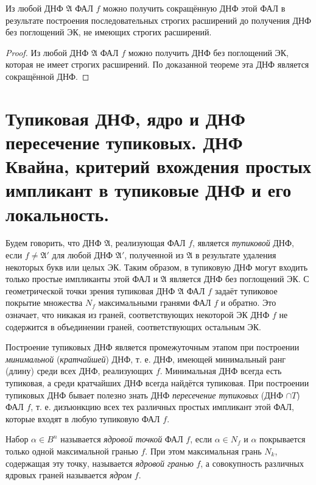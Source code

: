 \documentclass[11pt]{article}
\def\zall{\setcounter{lem}{0}\setcounter{cnsqnc}{0}\setcounter{th}{0}\setcounter{Cmt}{0}\setcounter{equation}{0}\setcounter{stnmt}{0}}
\newcounter{lem}\setcounter{lem}{0}
\newcounter{th}\setcounter{th}{0}
\newcounter{cnsqnc}\setcounter{cnsqnc}{0}
\def\cnsqnc{\par\smallskip\refstepcounter{cnsqnc}\textbf{\arabic{cnsqnc}}}
\newtheorem*{Consequence}{Следствие \cnsqnc}
\newcounter{Cmt}\setcounter{Cmt}{0}
\newcounter{stnmt}\setcounter{stnmt}{0}
\begin{document}
\begin{Consequence}
Из любой ДНФ $\mathfrak{A}$ ФАЛ $f$ можно получить сокращённую ДНФ этой ФАЛ в результате построения последовательных строгих расширений до получения ДНФ без поглощений ЭК, не имеющих строгих расширений.
\end{Consequence}
\begin{proof}
Из любой ДНФ $\mathfrak{A}$ ФАЛ $f$ можно получить ДНФ без поглощений ЭК, которая не имеет строгих расширений. По доказанной теореме эта ДНФ является сокращённой ДНФ.
\end{proof}
\pagebreak
\zall
\section{Тупиковая ДНФ, ядро и ДНФ пересечение тупиковых. ДНФ Квайна, критерий вхождения простых импликант в тупиковые ДНФ и его локальность.}
\label{sec:org9be750a}
Будем говорить, что ДНФ \(\mathfrak{A}\), реализующая ФАЛ \(f\), является \emph{тупиковой} ДНФ, если \(f \neq \mathfrak{A'}\) для любой ДНФ \(\mathfrak{A'}\), полученной из \(\mathfrak{A}\) в результате удаления некоторых букв или целых ЭК. Таким образом, в тупиковую ДНФ могут входить только простые импликанты этой ФАЛ и \(\mathfrak{A}\) является ДНФ без поглощений ЭК. С геометрической точки зрения тупиковая ДНФ \(\mathfrak{A}\) ФАЛ \(f\) задаёт тупиковое покрытие множества \(N_f\) максимальными гранями ФАЛ \(f\) и обратно. Это означает, что никакая из граней, соответствующих некоторой ЭК ДНФ \(f\) не содержится в объединении граней, соответствующих остальным ЭК.

Построение тупиковых ДНФ является промежуточным этапом при построении \emph{минимальной} (\emph{кратчайшей}) ДНФ, т. е. ДНФ, имеющей минимальный ранг (длину) среди всех ДНФ, реализующих \(f\). Минимальная ДНФ всегда есть тупиковая, а среди кратчайших ДНФ всегда найдётся тупиковая.
При построении тупиковых ДНФ бывает полезно знать ДНФ \emph{пересечение тупиковых} (ДНФ \(\cap T\)) ФАЛ \(f\), т. е. дизъюнкцию всех тех различных простых импликант этой ФАЛ, которые входят в любую тупиковую ФАЛ \(f\).

Набор \(\alpha \in B^n\) называется \emph{ядровой точкой} ФАЛ \(f\), если \(\alpha \in N_f\) и \(\alpha\) покрывается только одной максимальной гранью \(f\). При этом максимальная грань \(N_k\), содержащая эту точку, называется \emph{ядровой гранью} \(f\), а совокупность различных ядровых граней называется \emph{ядром} \(f\).
\end{document}

